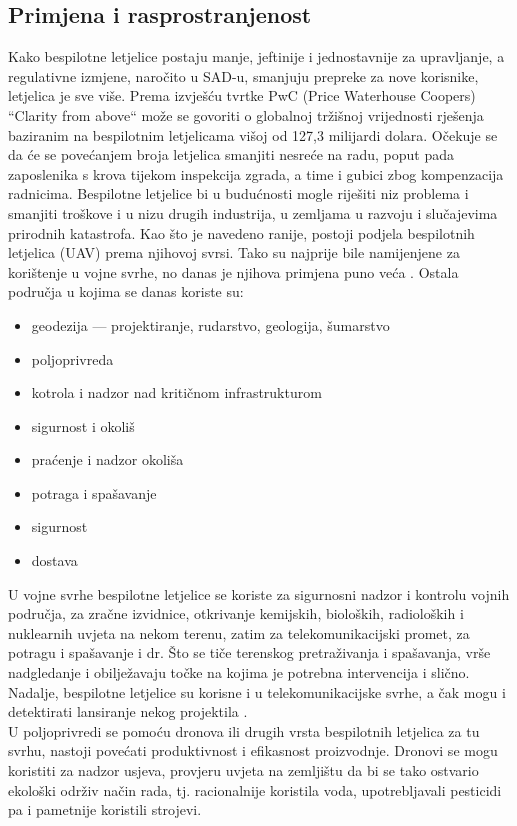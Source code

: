 \documentclass[times, utf8, diplomski]{fer}
\begin{document}
\subsection{Primjena i rasprostranjenost}
Kako bespilotne  letjelice  postaju  manje,  jeftinije  i  jednostavnije za  upravljanje,  a regulativne izmjene, naročito u SAD-u, smanjuju prepreke za nove korisnike, letjelica je sve više. 
Prema izvješću tvrtke PwC (Price Waterhouse Coopers) “Clarity from above“ može se govoriti o globalnoj tržišnoj vrijednosti rješenja baziranim na bespilotnim letjelicama višoj od 127,3 milijardi dolara.
Očekuje se da će se povećanjem broja letjelica smanjiti nesreće na radu, 
poput pada zaposlenika s krova tijekom inspekcija zgrada, a time i gubici zbog kompenzacija 
radnicima. 
Bespilotne letjelice bi u budućnosti mogle riješiti niz problema i smanjiti troškove i u nizu drugih industrija, u zemljama u razvoju i slučajevima prirodnih katastrofa. \citep{Allianz}
Kao što je navedeno ranije, postoji podjela bespilotnih letjelica (UAV) prema njihovoj svrsi. Tako  su  najprije  bile  namijenjene za korištenje u vojne svrhe, no danas je njihova primjena puno veća \citep{TheUseOfUAS}. Ostala područja u kojima se danas koriste su:\begin{itemize}
\item geodezija --- projektiranje, rudarstvo, geologija, šumarstvo
\item poljoprivreda
\item kotrola i nadzor nad kritičnom infrastrukturom
\item sigurnost i okoliš
\item praćenje i nadzor okoliša
\item potraga i spašavanje
\item sigurnost
\item dostava
\end{itemize}
U  vojne  svrhe bespilotne  letjelice  se  koriste  za  sigurnosni  nadzor  i  kontrolu  vojnih područja, za zračne izvidnice, otkrivanje kemijskih, bioloških, radioloških i nuklearnih uvjeta na nekom terenu, zatim za telekomunikacijski promet, za potragu i spašavanje i dr. Što se tiče terenskog  pretraživanja  i  spašavanja,  vrše  nadgledanje  i  obilježavaju  točke  na  kojima  je potrebna intervencija i slično. Nadalje, bespilotne letjelice  su  korisne  i  u  telekomunikacijske svrhe, a čak mogu i detektirati lansiranje nekog projektila \citep{Military}.\\
U poljoprivredi se pomoću dronova ili drugih vrsta bespilotnih letjelica za tu svrhu, nastoji povećati produktivnost i efikasnost  proizvodnje.  Dronovi  se  mogu  koristiti  za  nadzor usjeva,  provjeru  uvjeta  na  zemljištu  da  bi  se  tako  ostvario  ekološki  održiv  način  rada,  tj. racionalnije koristila voda, upotrebljavali pesticidi pa i pametnije koristili strojevi.
\end{document}
